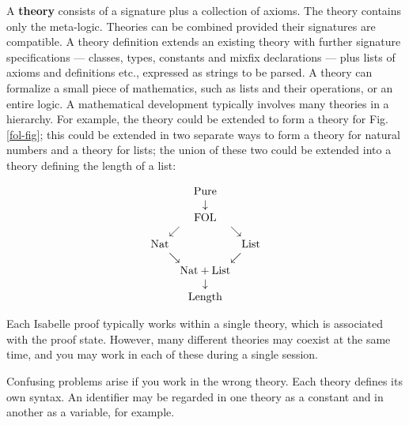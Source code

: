  A {\bf theory} consists of a signature plus a
collection of axioms.  The {\Pure} theory contains only the
meta-logic.  Theories can be combined provided their signatures are
compatible.  A theory definition extends an existing theory with
further signature specifications --- classes, types, constants and
mixfix declarations --- plus lists of axioms and definitions etc.,
expressed as strings to be parsed.  A theory can formalize a small
piece of mathematics, such as lists and their operations, or an entire
logic.  A mathematical development typically involves many theories in
a hierarchy.  For example, the {\Pure} theory could be extended to
form a theory for Fig.\ts\ref{fol-fig}; this could be extended in two
separate ways to form a theory for natural numbers and a theory for
lists; the union of these two could be extended into a theory defining
the length of a list:
\begin{tt}
\[
\begin{array}{c@{}c@{}c@{}c@{}c}
     {}   &     {}   &\hbox{Pure}&     {}  &     {}  \\
     {}   &     {}   &  \downarrow &     {}   &     {}   \\
     {}   &     {}   &\hbox{FOL} &     {}   &     {}   \\
     {}   & \swarrow &     {}    & \searrow &     {}   \\
 \hbox{Nat} &   {}   &     {}    &     {}   & \hbox{List} \\
     {}   & \searrow &     {}    & \swarrow &     {}   \\
     {}   &     {} &\hbox{Nat}+\hbox{List}&  {}   &     {}   \\
     {}   &     {}   &  \downarrow &     {}   &     {}   \\
     {}   &     {} & \hbox{Length} &  {}   &     {}
\end{array}
\]
\end{tt}%
Each Isabelle proof typically works within a single theory, which is
associated with the proof state.  However, many different theories may
coexist at the same time, and you may work in each of these during a single
session.  

\begin{warn}%
  Confusing problems arise if you work in the wrong theory.  Each theory
  defines its own syntax.  An identifier may be regarded in one theory as a
  constant and in another as a variable, for example.
\end{warn}

